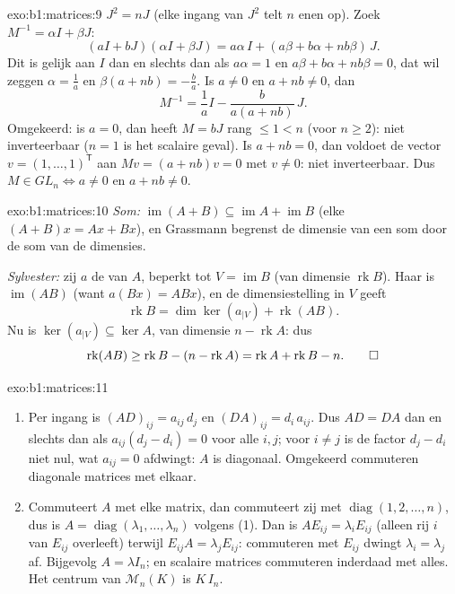 \begin{solution}{exo:b1:matrices:9}
$J^2 = nJ$ (elke ingang van $J^2$ telt $n$ enen op). Zoek $M^{-1} =
\alpha I + \beta J$:
\[
(aI + bJ)(\alpha I + \beta J)
= a\alpha\, I + (a\beta + b\alpha + nb\beta)\, J .
\]
Dit is gelijk aan $I$ dan en slechts dan als $a\alpha = 1$ en
$a\beta + b\alpha + nb\beta = 0$, dat wil zeggen $\alpha =
\frac1a$ en $\beta(a + nb) = -\frac ba$. Is $a \neq 0$ en $a + nb
\neq 0$, dan
\[
M^{-1} = \frac 1a I - \frac{b}{a(a + nb)}\, J .
\]
Omgekeerd: is $a = 0$, dan heeft $M = bJ$ rang $\leq 1 < n$ (voor
$n \geq 2$): niet inverteerbaar ($n = 1$ is het scalaire geval). Is
$a + nb = 0$, dan voldoet de vector $v = (1, \dots, 1)^{\mathsf T}$
aan $Mv = (a + nb)v = 0$ met $v \neq 0$: niet inverteerbaar. Dus $M
\in GL_n \iff a \neq 0$ en $a + nb \neq 0$.
\end{solution}

\begin{solution}{exo:b1:matrices:10}
\emph{Som:} $\operatorname{im}(A + B) \subseteq \operatorname{im} A
+ \operatorname{im} B$ (elke $(A+B)x = Ax + Bx$), en Grassmann
begrenst de dimensie van een som door de som van de dimensies.

\emph{Sylvester:} zij $a$ de  van $A$, beperkt tot $V =
\operatorname{im} B$ (van dimensie $\operatorname{rk} B$). Haar
 is $\operatorname{im}(AB)$ (want $a(Bx) = ABx$), en de
dimensiestelling in $V$ geeft
\[
\operatorname{rk} B = \dim\ker(a_{|V}) + \operatorname{rk}(AB) .
\]
Nu is $\ker(a_{|V}) \subseteq \ker A$, van dimensie $n -
\operatorname{rk} A$: dus
\[
\operatorname{rk}(AB) \geq \operatorname{rk} B - (n -
\operatorname{rk} A) = \operatorname{rk} A + \operatorname{rk} B -
n . \qedhere
\]
\end{solution}

\begin{solution}{exo:b1:matrices:11}
\begin{enumerate}
  \item Per ingang is $(AD)_{ij} = a_{ij}\,d_j$ en $(DA)_{ij} =
        d_i\,a_{ij}$. Dus $AD = DA$ dan en slechts dan als
        $a_{ij}(d_j - d_i) = 0$ voor alle $i, j$; voor $i \neq j$ is
        de factor $d_j - d_i$ niet nul, wat $a_{ij} = 0$ afdwingt:
        $A$ is diagonaal. Omgekeerd commuteren diagonale matrices
        met elkaar.
  \item Commuteert $A$ met elke matrix, dan commuteert zij met
        $\operatorname{diag}(1, 2, \dots, n)$, dus is $A =
        \operatorname{diag}(\lambda_1, \dots, \lambda_n)$ volgens
        (1). Dan is $A E_{ij} = \lambda_i E_{ij}$ (alleen rij $i$
        van $E_{ij}$ overleeft) terwijl $E_{ij} A = \lambda_j
        E_{ij}$: commuteren met $E_{ij}$ dwingt $\lambda_i =
        \lambda_j$ af. Bijgevolg $A = \lambda I_n$; en scalaire
        matrices commuteren inderdaad met alles. Het centrum van
        $\mathcal{M}_n(K)$ is $K\,I_n$.
\end{enumerate}
\end{solution}

